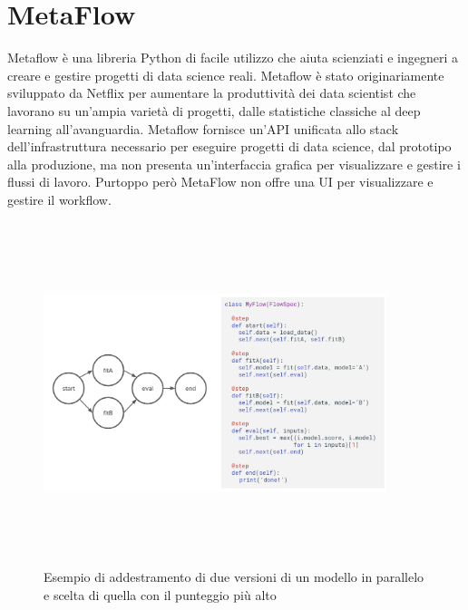 \documentclass[12pt,a4paper]{report}
\begin{document}
\section{MetaFlow}
Metaflow è una libreria Python di facile utilizzo che aiuta scienziati e ingegneri a creare e gestire progetti di data science reali. Metaflow è stato originariamente sviluppato da Netflix per aumentare la produttività dei data scientist che lavorano su un'ampia varietà di progetti, dalle statistiche classiche al deep learning all'avanguardia. \cite{MetaFLow}
Metaflow fornisce un'API unificata allo stack dell'infrastruttura necessario per eseguire progetti di data science, dal prototipo alla produzione, ma non presenta un'interfaccia grafica per visualizzare e gestire i flussi di lavoro.
Purtoppo però MetaFlow non offre una UI per visualizzare e gestire il workflow.\\

\begin{figure}[h!]
    \begin{center}
        \includegraphics[width=10cm,height=10cm,keepaspectratio]{MetaFlow}
    \end{center}
    \caption{Esempio di addestramento di due versioni di un modello in parallelo e scelta di quella con il punteggio più alto}
    \label{fig:ex-MetaFlow}
\end{figure}
\end{document}
